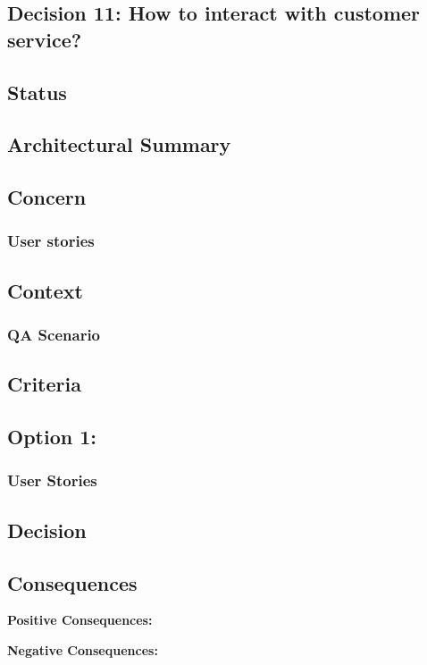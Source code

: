 \subsection{Decision 11: How to interact with customer service?}

\subsection*{Status}

\subsection*{Architectural Summary}


\subsection*{Concern}
\subsubsection*{User stories}

\subsection*{Context}
\subsubsection*{QA Scenario} %

\subsection*{Criteria}
\begin{itemize}
\end{itemize}

\subsection*{Option 1: }
\subsubsection*{User Stories}
\subsection*{Decision}
\subsection*{Consequences}
\textbf{Positive Consequences:}
\begin{itemize}
\end{itemize}
\textbf{Negative Consequences:}
\begin{itemize}
\end{itemize}